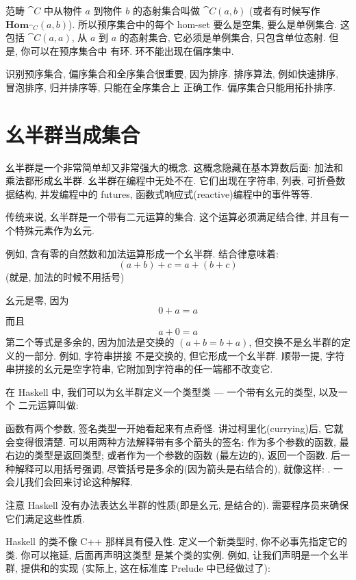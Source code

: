 范畴 $\cat{C}$ 中从物件 $a$ 到物件 $b$ 的态射集合叫做 $\cat{C}(a, b)$ (或者有时候写作
$\mathbf{Hom}_{\cat{C}}(a, b)$). 所以预序集合中的每个 hom-set 要么是空集, 要么是单例集合. 这包括
$\cat{C}(a, a)$, 从 $a$ 到 $a$ 的态射集合, 它必须是单例集合, 只包含单位态射. 但是, 你可以在预序集合中
有环. 环不能出现在偏序集中.

识别预序集合, 偏序集合和全序集合很重要, 因为排序. 排序算法, 例如快速排序, 冒泡排序, 归并排序等, 只能在全序集合上
正确工作. 偏序集合只能用拓扑排序.

\section{幺半群当成集合}

幺半群是一个非常简单却又非常强大的概念. 这概念隐藏在基本算数后面: 加法和乘法都形成幺半群. 幺半群在编程中无处不在.
它们出现在字符串, 列表, 可折叠数据结构, 并发编程中的 futures, 函数式响应式(reactive)编程中的事件等等.

传统来说, 幺半群是一个带有二元运算的集合. 这个运算必须满足结合律, 并且有一个特殊元素作为幺元.

例如, 含有零的自然数和加法运算形成一个幺半群. 结合律意味着:
\[(a + b) + c = a + (b + c)\]
(就是, 加法的时候不用括号)

幺元是零, 因为
\[0 + a = a\]
而且
\[a + 0 = a\]
第二个等式是多余的, 因为加法是交换的 $(a + b = b + a)$, 但交换不是幺半群的定义的一部分. 例如, 字符串拼接
不是交换的, 但它形成一个幺半群. 顺带一提, 字符串拼接的幺元是空字符串, 它附加到字符串的任一端都不改变它.

在 Haskell 中, 我们可以为幺半群定义一个类型类 --- 一个带有幺元的类型, 以及一个
二元运算叫做:


函数有两个参数, 签名类型一开始看起来有点奇怪. 讲过柯里化(currying)后, 它就会变得很清楚.
可以用两种方法解释带有多个箭头的签名: 作为多个参数的函数, 最右边的类型是返回类型; 或者作为一个参数的函数
(最左边的), 返回一个函数. 后一种解释可以用括号强调, 尽管括号是多余的(因为箭头是右结合的), 就像这样:
. 一会儿我们会回来讨论这种解释.

注意 Haskell 没有办法表达幺半群的性质(即是幺元, 是结合的).
需要程序员来确保它们满足这些性质.

Haskell 的类不像 C++ 那样具有侵入性. 定义一个新类型时, 你不必事先指定它的类. 你可以拖延, 后面再声明这类型
是某个类的实例. 例如, 让我们声明是一个幺半群, 提供和的实现
(实际上, 这在标准库 Prelude 中已经做过了):

